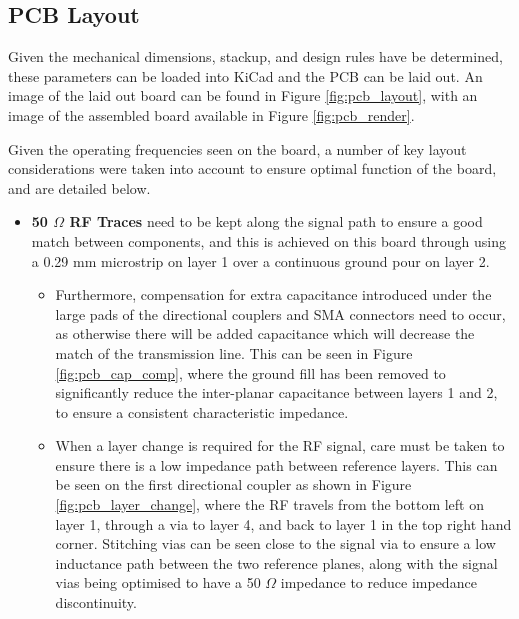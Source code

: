 \subsection{PCB Layout}
Given the mechanical dimensions, stackup, and design rules have be determined, these parameters can be loaded into KiCad and the PCB can be laid out. An image of the laid out board can be found in Figure \ref{fig:pcb_layout}, with an image of the assembled board available in Figure \ref{fig:pcb_render}.

Given the operating frequencies seen on the board, a number of key layout considerations were taken into account to ensure optimal function of the board, and are detailed below.
\begin{itemize}
	\item \textbf{50 $\Omega$ RF Traces} need to be kept along the signal path to ensure a good match between components, and this is achieved on this board through using a 0.29 mm microstrip on layer 1 over a continuous ground pour on layer 2. 
	\begin{itemize}
		\item Furthermore, compensation for extra capacitance introduced under the large pads of the directional couplers and SMA connectors need to occur, as otherwise there will be added capacitance which will decrease the match of the transmission line. This can be seen in Figure \ref{fig:pcb_cap_comp}, where the ground fill has been removed to significantly reduce the inter-planar capacitance between layers 1 and 2, to ensure a consistent characteristic impedance. 
		\item When a layer change is required for the RF signal, care must be taken to ensure there is a low impedance path between reference layers. This can be seen on the first directional coupler as shown in Figure \ref{fig:pcb_layer_change}, where the RF travels from the bottom left on layer 1, through a via to layer 4, and back to layer 1 in the top right hand corner. Stitching vias can be seen close to the signal via to ensure a low inductance path between the two reference planes, along with the signal vias being optimised to have a 50 $\Omega$ impedance to reduce impedance discontinuity. 
		

\end{itemize}
\end{itemize}
